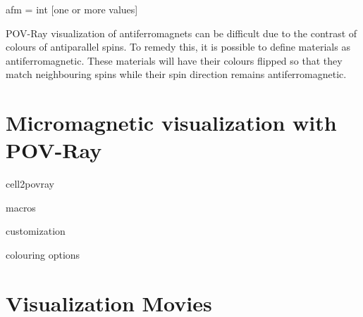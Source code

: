 {\zicf afm = int [one or more values] } POV-Ray visualization of antiferromagnets can be difficult due to the contrast of colours of antiparallel spins. To remedy this, it is possible to define materials as antiferromagnetic. These materials will have their colours flipped so that they match neighbouring spins while their spin direction remains antiferromagnetic.

\section*{Micromagnetic visualization with POV-Ray}
cell2povray

macros

customization

colouring options

\section*{Visualization Movies}
